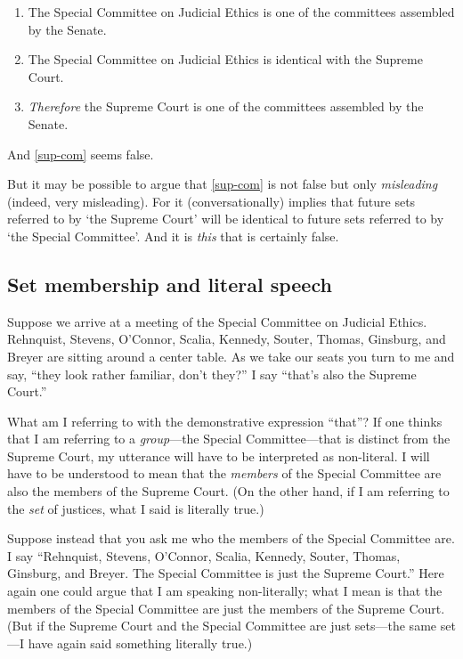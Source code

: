 \documentclass[11pt]{article}
\begin{document}
\begin{spacing}{1.5}
\begin{enumerate}[ref=(\arabic*)]
  \item The Special Committee on Judicial Ethics is one of the
    committees assembled by the Senate.

  \item The Special Committee on Judicial Ethics is identical with the
    Supreme Court.

  \item {\em Therefore} the Supreme Court is one of the committees
    assembled by the
    Senate. \citep[144]{uzquiano2004a} \label{sup-com}
\end{enumerate}

And \ref{sup-com} seems false.

But it may be possible to argue that \ref{sup-com} is not false but
only {\em misleading} (indeed, very misleading).  For it
(conversationally) implies that future sets referred to by `the
Supreme Court' will be identical to future sets referred to by `the
Special Committee'.  And it is {\em this} that is certainly false.

\subsection{Set membership and literal speech}
\label{implicate}
Suppose we arrive at a meeting of the Special Committee on Judicial
Ethics.  Rehnquist, Stevens, O'Connor, Scalia, Kennedy, Souter,
Thomas, Ginsburg, and Breyer are sitting around a center table.  As we
take our seats you turn to me and say, ``they look rather familiar,
don't they?''  I say ``that's also the Supreme Court.''

What am I referring to with the demonstrative expression ``that''?  If
one thinks that I am referring to a {\em group}---the Special
Committee---that is distinct from the Supreme Court, my utterance will
have to be interpreted as non-literal.  I will have to be understood
to mean that the {\em members} of the Special Committee are also the
members of the Supreme Court.  (On the other hand, if I am referring
to the {\em set} of justices, what I said is literally true.)

Suppose instead that you ask me who the members of the Special
Committee are.  I say ``Rehnquist, Stevens, O'Connor, Scalia, Kennedy,
Souter, Thomas, Ginsburg, and Breyer.  The Special Committee is just
the Supreme Court.''  Here again one could argue that I am speaking
non-literally; what I mean is that the members of the Special
Committee are just the members of the Supreme Court.  (But if the
Supreme Court and the Special Committee are just sets---the same
set---I have again said something literally true.)


\end{spacing}
\end{document}
